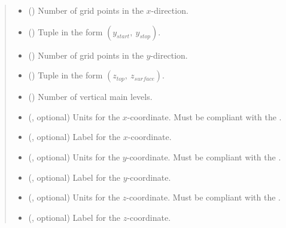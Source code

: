 \documentclass[letterpaper,10pt,english]{sphinxmanual}
\begin{document}
\begin{fulllineitems}
\begin{fulllineitems}
\begin{quote}
\begin{description}
\begin{itemize}
\item {} 
{\hyperref[\detokenize{api:grids.xyz_grid.XYZGrid.nx}]{}} () \textendash{} Number of grid points in the \(x\)-direction.

\item {} 
 () \textendash{} Tuple in the form \((y_{start}, ~ y_{stop})\).

\item {} 
{\hyperref[\detokenize{api:grids.xyz_grid.XYZGrid.ny}]{}} () \textendash{} Number of grid points in the \(y\)-direction.

\item {} 
 () \textendash{} Tuple in the form \((z_{top}, ~ z_{surface})\).

\item {} 
 () \textendash{} Number of vertical main levels.

\item {} 
 (, optional) \textendash{} 
Units for the \(x\)-coordinate. Must be compliant
with the .


\item {} 
 (, optional) \textendash{} Label for the \(x\)-coordinate.

\item {} 
 (, optional) \textendash{} 
Units for the \(y\)-coordinate. Must be compliant
with the .


\item {} 
 (, optional) \textendash{} Label for the \(y\)-coordinate.

\item {} 
 (, optional) \textendash{} 
Units for the \(z\)-coordinate. Must be compliant
with the .


\item {} 
 (, optional) \textendash{} Label for the \(z\)-coordinate.


\end{itemize}
\end{description}
\end{quote}
\end{fulllineitems}
\end{fulllineitems}
\end{document}
